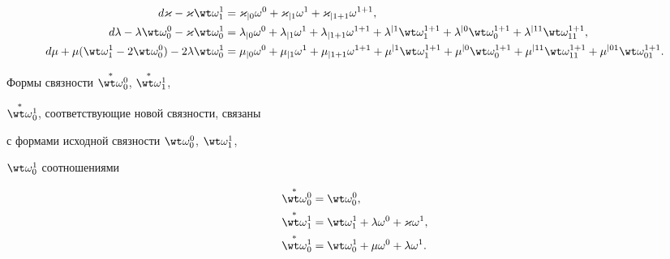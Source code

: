 \begin{align} 


d\varkappa-\varkappa\wt\omega^1_1&=\varkappa_{|0}\omega^0+ 


\varkappa_{|1}\omega^1+\varkappa_{|1+1}\omega^{1+1},\notag\\ 


d\lambda-\lambda\wt\omega^0_0-\varkappa\wt\omega^1_0&= 


\lambda_{|0}\omega^0+\lambda_{|1}\omega^1+ 


\lambda_{|1+1}\omega^{1+1}+\lambda^{|1}\wt\omega^{1+1}_1+ 


\lambda^{|0}\wt\omega^{1+1}_0+ 


\lambda^{|11}\wt\omega^{1+1}_{11},\\ 


d\mu+\mu(\wt\omega^1_1-2\wt\omega^0_0)- 


2\lambda\wt\omega^1_0&=\mu_{|0}\omega^0+\mu_{|1}\omega^1+ 


\mu_{|1+1}\omega^{1+1}+\mu^{|1}\wt\omega^{1+1}_1+ 


\mu^{|0}\wt\omega^{1+1}_0+\mu^{|11}\wt\omega^{1+1}_{11}+ 


\mu^{|01}\wt\omega^{1+1}_{01}.\notag 


\end{align} 


 


Формы связности $\up{*}{\wt\omega}^0_0$, $\up{*}{\wt\omega}^1_1$, 


$\up{*}{\wt\omega}^1_0$, соответствующие новой связности, связаны 


с формами исходной связности $\wt\omega^0_0$, $\wt\omega^1_1$, 


$\wt\omega^1_0$ соотношениями 


\begin{align*} 


\up{*}{\wt\omega}^0_0&=\wt\omega^0_0,\\ 


\up{*}{\wt\omega}^1_1&=\wt\omega^1_1+\lambda\omega^0+ 


\varkappa\omega^1,\\ 


\up{*}{\wt\omega}^1_0&=\wt\omega^1_0+\mu\omega^0+ 


\lambda\omega^1. 


\end{align*} 


 


